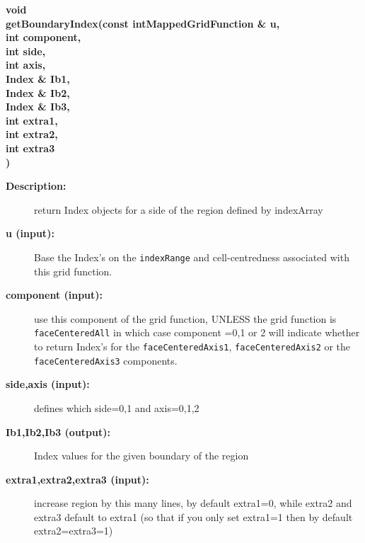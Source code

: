 \begin{flushleft} \textbf{%
void  \\ 
\settowidth{\OGgetIndexIncludeArgIndent}{getBoundaryIndex(}%
getBoundaryIndex(const intMappedGridFunction \& u, \\ 
\hspace{\OGgetIndexIncludeArgIndent}int component,\\ 
\hspace{\OGgetIndexIncludeArgIndent}int side, \\ 
\hspace{\OGgetIndexIncludeArgIndent}int axis, \\ 
\hspace{\OGgetIndexIncludeArgIndent}Index \& Ib1, \\ 
\hspace{\OGgetIndexIncludeArgIndent}Index \& Ib2, \\ 
\hspace{\OGgetIndexIncludeArgIndent}Index \& Ib3, \\ 
\hspace{\OGgetIndexIncludeArgIndent}int extra1,\\ 
\hspace{\OGgetIndexIncludeArgIndent}int extra2,\\ 
\hspace{\OGgetIndexIncludeArgIndent}int extra3\\ 
\hspace{\OGgetIndexIncludeArgIndent})
}\end{flushleft}
\begin{description}
\item[{\bf Description:}] 
   return Index objects for a side of the region defined by indexArray

\item[{\bf u (input):}]  Base the Index's on the {\tt indexRange} and cell-centredness associated   
     with this grid function. 
\item[{\bf component (input):}]  use this component of the grid function, UNLESS the grid function 
    is {\tt faceCenteredAll} in which case component =0,1 or 2 will indicate whether to return
   Index's for the {\tt faceCenteredAxis1}, {\tt faceCenteredAxis2} or the {\tt faceCenteredAxis3} components.
\item[{\bf side,axis (input):}]  defines which side=0,1 and axis=0,1,2
\item[{\bf Ib1,Ib2,Ib3 (output):}]  Index values for the given boundary of the region
\item[{\bf extra1,extra2,extra3 (input):}]  increase region by this many lines, by default extra1=0, while 
                         extra2 and extra3 default to extra1 (so that if you only set extra1=1
                         then by default extra2=extra3=1)
\end{description}
